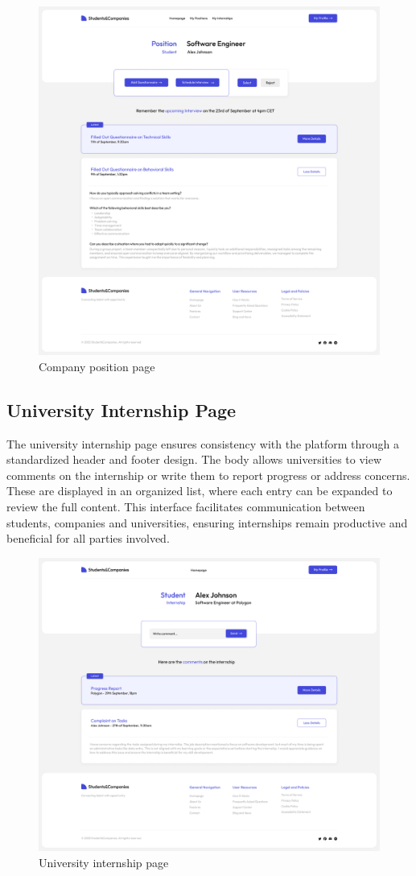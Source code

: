 \begin{figure}
    \centering
    \includegraphics[width=16cm]{images/selected-pages/company-position.png}
    \caption{Company position page}
\end{figure}

\subsection{University Internship Page}
The university internship page ensures consistency with the platform through a standardized header and footer design.
The body allows universities to view comments on the internship or write them to report progress or address concerns.
These are displayed in an organized list, where each entry can be expanded to review the full content.
This interface facilitates communication between students, companies and universities, ensuring internships remain productive and beneficial for all parties involved.

\begin{figure}[h]
    \centering
    \includegraphics[width=16cm]{images/selected-pages/university-internship.png}
    \caption{University internship page}
\end{figure}
